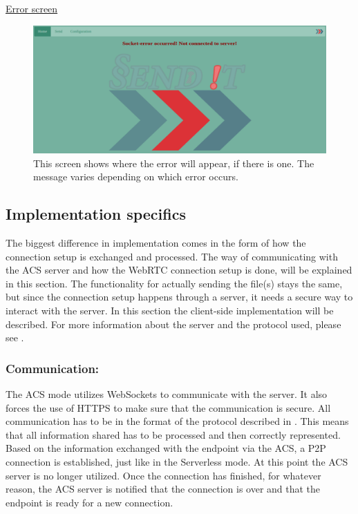 \pagebreak
%
\noindent
\underline{Error screen}
\begin{figure}[H]
  \centering
  \includegraphics[width=\textwidth]{Figures/ACS/error}
  \decoRule
  \caption[ACS mode: Error screen]{This screen shows where the error will appear, if there is one. The message varies depending on which error occurs.}
  \label{fig:ACS_err}
\end{figure}

%
\subsection{Implementation specifics}
\label{sec:acsimp}
%
The biggest difference in implementation comes in the form of how the connection setup is exchanged and processed. The way of communicating with the ACS server and how the WebRTC connection setup is done, will be explained in this section. The functionality for actually sending the file(s) stays the same, but since the connection setup happens through a server, it needs a secure way to interact with the server. In this section the client-side implementation will be described. For more information about the server and the protocol used, please see . 
%
\subsubsection*{Communication:}
%
The ACS mode utilizes WebSockets to communicate with the server. It also forces the use of HTTPS to make sure that the communication is secure. All communication has to be in the format of the protocol described in . This means that all information shared has to be processed and then correctly represented. Based on the information exchanged with the endpoint via the ACS, a P2P connection is established, just like in the Serverless mode. At this point the ACS server is no longer utilized. Once the connection has finished, for whatever reason, the ACS server is notified that the connection is over and that the endpoint is ready for a new connection.
%
